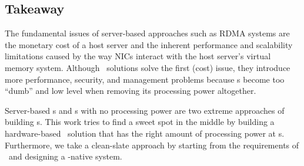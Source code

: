 
\subsection{Takeaway}
The fundamental issues of server-based approaches such as RDMA systems are the monetary cost of a host server and the inherent performance and scalability limitations caused by the way NICs interact with the host server's virtual memory system.
Although \pdm\ solutions solve the first (cost) issue, they introduce more performance, security, and management problems
because \MN{}s become too ``dumb'' and low level when removing its processing power altogether.

Server-based \MN{}s and \MN{}s with no processing power are two extreme approaches of building \MN{}s.
This work tries to find a sweet spot in the middle by building a hardware-based \md\ solution that has the right amount of processing power at \MN{}s.
Furthermore, we take a clean-slate approach by starting from the requirements of \md\
and designing a \md-native system.
\fi


